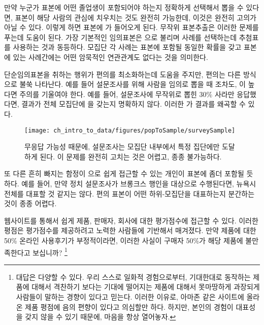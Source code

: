 만약 누군가 표본에 어떤 졸업생이 포함되어야 하는지 정확하게 선택해서 뽑을 수 있다면, 표본이 해당 사람의 관심에 치우치는 것도 완전히 가능한데, 이것은 완전히 고의가 아닐 수 있다. 이렇게 하면 표본에 가 들어오게 된다. 무작위 표본추출은 이러한 문제를 푸는데 도움이 된다. 가장 기본적인 임의표본은  으로 불리며 사례를 선택하는데 추첨표를 사용하는 것과 동등하다.
모집단 각 사례는 표본에 포함될 동일한 확률을 갖고 표본에 있는 사례간에는 어떤 암묵적인 연관관계도 없다는 것을 의미한다.


단순임의표본을 취하는 행위가 편의를 최소화하는데 도움을 주지만, 편의는 다른 방식으로 불쑥 나타난다.
예를 들어 설문조사를 위해 사람을 임의로 뽑을 때 조차도,  이 높다면 주의를 기울여야 한다.
예를 들어, 설문조사에 무작위로 뽑힌 30\% 사라만 응답했다면,
결과가 전체 모집단에 을 갖는지 명확하지 않다. 이러한  가 결과를 
왜곡할 수 있다.

\begin{figure}[h]
\centering
\texttt{[image: ch\_intro\_to\_data/figures/popToSample/surveySample]}
\caption{
무응답 가능성 때문에, 설문조사는 모집단 내부에서 특정 집단에만 도달하게 된다.
이 문제를 완전히 고치는 것은 어렵고, 종종 불가능하다.}
\label{surveySample}
\end{figure}

또 다른 흔히 빠지는 함정이 으로 쉽게 접근할 수 있는 개인이 표본에 좀더 포함될 듯 하다.
예를 들어, 만약 정치 설문조사가 브롱크스 행인을 대상으로 수행된다면, 뉴욕시 전체를 대표할 것 같지는 않다.
편의 표본이 어떤 하위-모집단을 대표하는지 분간하는 것이 종종 어렵다.

\begin{exercise}
웹사이트를 통해서 쉽게 제품, 판매자, 회사에 대한 평가점수에 접근할 수 있다.
이러한 평점은 평가점수를 제공하려고 노력한 사람들에 기반해서 매겨졌다.
만약 제품에 대한 50\% 온라인 사용후기가 부정적이라면, 이러한 사실이 구매자 50\%가 해당 제품에 불만족한다고 보십니까?
\footnote{대답은 다양할 수 있다.
우리 스스로 일화적 경험으로부터,
기대한대로 동작하는 제품에 대해서 격찬하기 보다는 기대에 떨어지는 제품에 대해서 못마땅하게 과장되게 사람들이 말하는 경향이 있다고 믿는다. 이러한 이유로, 아마존 같은 사이트에 올라온 제품 평점에 음의 편향이 있다고 의심할만 하다.
하지만, 본인의 경험이 대표성을 갖지 않을 수 있기 때문에, 마음을 항상 열어놓자.}
\end{exercise}

